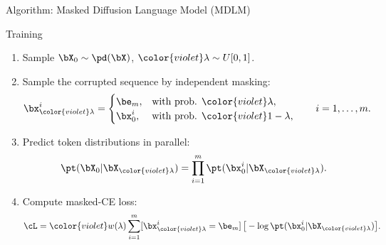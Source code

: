 \documentclass{beamer}
\begin{document}
\begin{frame}{Algorithm: Masked Diffusion Language Model (MDLM)}

	\begin{block}{Training}
		\begin{enumerate}
			\item Sample $\bX_0 \sim \pd(\bX)$, ${\color{violet}\lambda \sim U[0, 1]}$.
			\item Sample the corrupted sequence by independent masking:
			\vspace{-0.3cm}
			\[
				\bx_{\color{violet}\lambda}^i =
				\begin{cases}
					\be_m, & \text{with prob. }{\color{violet}\lambda},\\
					\bx_0^i, & \text{with prob. }{\color{violet}1-\lambda},
				\end{cases}
				\qquad i=1,\dots,m.
			\]
			\vspace{-0.5cm}
			\item Predict token distributions in parallel:
			\vspace{-0.3cm}
			\[
				\pt(\bX_0 | \bX_{\color{violet}\lambda})
				=
				\prod_{i=1}^m \pt(\bx_0^i | \bX_{\color{violet}\lambda}).
			\]
			\vspace{-0.5cm}
			\item Compute masked-CE loss:
			\vspace{-0.3cm}
			\[
				\cL
				=
				{\color{violet}w(\lambda)} \sum_{i=1}^m [\bx_{\color{violet}\lambda}^i=\be_m]\,
				\big[-\log \pt(\bx_0^i | \bX_{\color{violet}\lambda})\big].
			\]
		\end{enumerate}
	\end{block}

\end{frame}
\end{document}
